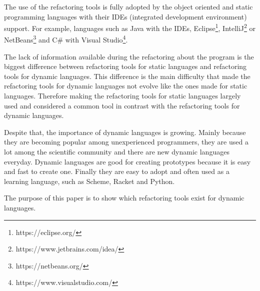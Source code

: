 The use of the refactoring tools is fully adopted by the object oriented and static programming languages with their IDEs (integrated development environment) support.
For example, languages such as Java with the IDEs, Eclipse\footnote{https://eclipse.org/}, IntelliJ\footnote{https://www.jetbrains.com/idea/} or NetBeans\footnote{https://netbeans.org/} and C\# with Visual Studio\footnote{https://www.visualstudio.com/}.

The lack of information available during the refactoring about the program is the biggest difference between refactoring tools for static languages and refactoring tools for dynamic languages.
This difference is the main difficulty that made the refactoring tools for dynamic languages not evolve like the ones made for static languages. 
Therefore making the refactoring tools for static languages largely used and considered a common tool in contrast with the refactoring tools for dynamic languages.  %

Despite that, the importance of dynamic languages is growing.
Mainly because they are becoming popular among unexperienced programmers, they are used a lot among the scientific community and there are new dynamic languages everyday. 
Dynamic languages are good for creating prototypes because it is easy and fast to create one. 
Finally they are easy to adopt and often used as a learning language, such as Scheme, Racket and Python. %


The purpose of this paper is to show which refactoring tools exist for dynamic languages. %








